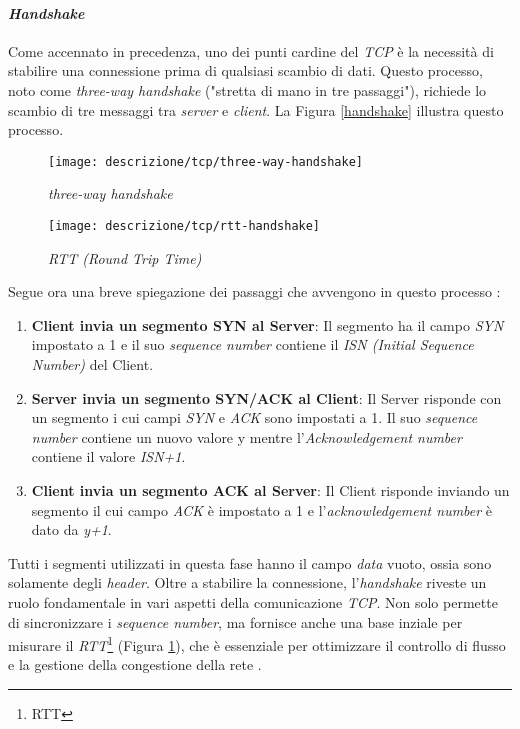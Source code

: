 \paragraph{\textit{Handshake}}

\noindent Come accennato in precedenza, uno dei punti cardine del \emph{TCP} è la necessità di stabilire una connessione prima di qualsiasi scambio di dati. Questo processo, noto come \emph{three-way handshake} ("stretta di mano in tre passaggi"), richiede lo scambio di tre messaggi tra \emph{server} e \emph{client}. La Figura \ref{handshake} illustra questo processo.

\begin{figure}[!h]
    \centering
    \begin{minipage}{0.48\textwidth}
        \centering
        \texttt{[image: descrizione/tcp/three-way-handshake]}
        \caption{\emph{three-way handshake}}
        \label{handshake}
    \end{minipage}
    \hfill
    \begin{minipage}{0.48\textwidth}
        \centering
        \texttt{[image: descrizione/tcp/rtt-handshake]}
        \caption{\emph{RTT (Round Trip Time)}}
        \label{rtt}
    \end{minipage}
\end{figure}

\noindent Segue ora una breve spiegazione dei passaggi che avvengono in questo processo : 

\begin{enumerate}
    \item \textbf{Client invia un segmento SYN al Server}: Il segmento ha il campo \emph{SYN} impostato a 1 e il suo \emph{sequence number} contiene il \emph{ISN (Initial Sequence Number)} del Client.
    \item \textbf{Server invia un segmento SYN/ACK al Client}: Il Server risponde con un segmento i cui campi \emph{SYN} e \emph{ACK} sono impostati a 1. Il suo \emph{sequence number} contiene un nuovo valore y mentre l'\emph{Acknowledgement number} contiene il valore \emph{ISN+1}.
    \item \textbf{Client invia un segmento ACK al Server}: Il Client risponde inviando un segmento il cui campo \emph{ACK} è impostato a 1 e l'\emph{acknowledgement number} è dato da \emph{y+1}.
\end{enumerate}

\noindent Tutti i segmenti utilizzati in questa fase hanno il campo \emph{data} vuoto, ossia sono solamente degli \emph{header}. 
Oltre a stabilire la connessione, l'\emph{handshake} riveste un ruolo fondamentale in vari aspetti della comunicazione \emph{TCP}.
Non solo permette di sincronizzare i \emph{sequence number}, ma fornisce anche una base inziale per misurare il \emph{RTT}\footnote{\gls{RTT}} (Figura \ref{rtt}), che è essenziale per ottimizzare il controllo di flusso e la gestione della congestione della rete \cite{site:tcp}.

